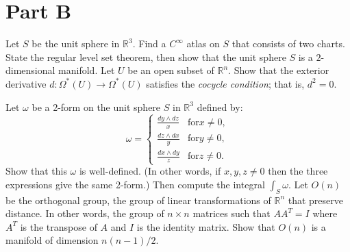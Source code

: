 \documentclass{exam}
\begin{document}
\section*{Part B}
\begin{questions}
    \question
        Let $S$ be the unit sphere in $\mathbb{R}^3$. Find a $C^\infty$ atlas on $S$ that consists of two charts.
    \question
        State the regular level set theorem, then show that the unit sphere $S$ is a $2$-dimensional manifold.
    \question
        Let $U$ be an open subset of $\mathbb{R}^n$. Show that the exterior derivative $d : \Omega^\ast(U) \to \Omega^\ast(U)$ satisfies the \textit{cocycle condition}; that is, $d^2=0$.
    \question
    \question
        Let $\omega$ be a 2-form on the unit sphere $S$ in $\mathbb{R}^3$ defined by:
        \[\omega = \begin{cases}
            \frac{dy\wedge dz}{x} & \text{for} x\not = 0,\\
            \frac{dz\wedge dx}{y} & \text{for} y\not = 0,\\
            \frac{dx\wedge dy}{z} & \text{for} z\not = 0.
        \end{cases}\]
        Show that this $\omega$ is well-defined. (In other words, if $x,y,z \not = 0$ then the three expressions give the same 2-form.) Then compute the integral $\int_S\omega$.
    \question
        Let $O(n)$ be the orthogonal group, the group of linear transformations of $\mathbb{R}^n$ that preserve distance. In other words, the group of $n\times n$ matrices such that $AA^T = I$ where $A^T$ is the transpose of $A$ and $I$ is the identity matrix. Show that $O(n)$ is a manifold of dimension $n(n-1)/2$.
    \end{questions}
\end{document}
